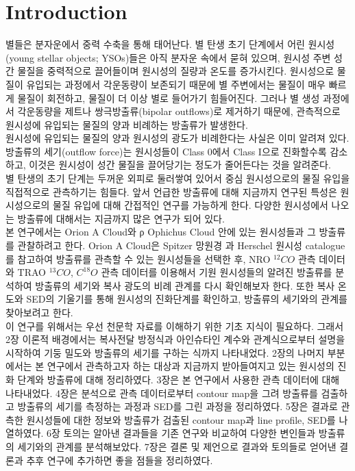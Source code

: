 
\section{Introduction}

별들은 분자운에서 중력 수축을 통해 태어난다. 별 탄생 초기 단계에서 어린 원시성(young stellar objects; YSOs)들은 아직 분자운 속에서 묻혀 있으며, 원시성 주변 성간 물질을 중력적으로 끌어들이며 원시성의 질량과 온도를 증가시킨다. 원시성으로 물질이 유입되는 과정에서 각운동량이 보존되기 때문에 별 주변에서는 물질이 매우 빠르게 물질이 회전하고, 물질이 더 이상 별로 들어가기 힘들어진다. 그러나 별 생성 과정에서 각운동량을 제트나 쌍극방출류(bipolar outflows)로 제거하기 때문에, 관측적으로 원시성에 유입되는 물질의 양과 비례하는 방출류가 발생한다. \cite{Bontemps} \\
원시성에 유입되는 물질의 양과 원시성의 광도가 비례한다는 사실은 이미 알려져 있다. \cite{Kang} 방출류의 세기(outflow force)는 원시성들이 Class 0에서 Class I으로 진화할수록 감소하고, 이것은 원시성이 성간 물질을 끌어당기는 정도가 줄어든다는 것을 알려준다. \\
별 탄생의 초기 단계는 두꺼운 외피로 둘러쌓여 있어서 중심 원시성으로의 물질 유입을 직접적으로 관측하기는 힘들다. 앞서 언급한 방출류에 대해 지금까지 연구된 특성은 원시성으로의 물질 유입에 대해 간접적인 연구를 가능하게 한다. 다양한 원시성에서 나오는 방출류에 대해서는 지금까지 많은 연구가 되어 있다.\\
본 연구에서는 Orion A Cloud와 ρ Ophichus Cloud 안에 있는 원시성들과 그 방출류를 관찰하려고 한다. Orion A Cloud은 Spitzer 망원경 \cite{Spitzer} \cite{OphDunham} 과 Herschel \cite{HerschelFurlan} 원시성 catalogue를 참고하여 방출류를 관측할 수 있는 원시성들을 선택한 후, NRO $^{12}CO$ 관측 데이터와 TRAO $^{13}CO$, $C^{18}O$ 관측 데이터를 이용해서 기원 원시성들의 알려진 방출류를 분석하여 방출류의 세기와 복사 광도의 비례 관계를 다시 확인해보자 한다. 또한 복사 온도와 SED의 기울기를 통해 원시성의 진화단계를 확인하고, 방출류의 세기와의 관계를 찾아보려고 한다. \\
이 연구를 위해서는 우선 천문학 자료를 이해하기 위한 기초 지식이 필요하다. 그래서 2장 이론적 배경에서는 복사전달 방정식과 아인슈타인 계수와 관계식으로부터 설명을 시작하여 기둥 밀도와 방출류의 세기를 구하는 식까지 나타내었다. 2장의 나머지 부분에서는 본 연구에서 관측하고자 하는 대상과 지금까지 받아들여지고 있는 원시성의 진화 단계와 방출류에 대해 정리하였다. 3장은 본 연구에서 사용한 관측 데이터에 대해 나타내었다. 4장은 분석으로 관측 데이터로부터 contour map을 그려 방출류를 검출하고 방출류의 세기를 측정하는 과정과 SED를 그린 과정을 정리하였다. 5장은 결과로 관측한 원시성들에 대한 정보와 방출류가 검출된 contour map과 line profile, SED를 나열하였다. 6장 토의는 알아낸 결과들을 기존 연구와 비교하여 다양한 변인들과 방출류의 세기와의 관계를 분석해보았다. 7장은 결론 및 제언으로 결과와 토의들로 얻어낸 결론과 추후 연구에 추가하면 좋을 점들을 정리하였다.



